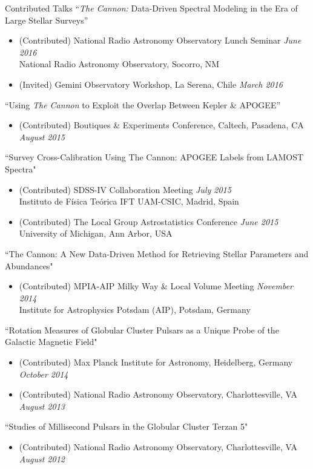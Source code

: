 \documentclass{resume} %
\begin{document}
\begin{rSection}{Contributed Talks}
``\emph{The Cannon:} Data-Driven Spectral Modeling in the Era of Large Stellar Surveys''
\begin{itemize}
  \item
    (Contributed) National Radio Astronomy Observatory Lunch Seminar 
    \hfill {\em June 2016} \\
    National Radio Astronomy Observatory, Socorro, NM
  \item
  (Invited) Gemini Observatory Workshop, La Serena, Chile \hfill {\em March 2016}
\end{itemize}
``Using \emph{The Cannon} to Exploit the Overlap Between Kepler \& APOGEE''
\begin{itemize}
  \item
    (Contributed) Boutiques \& Experiments Conference, Caltech, Pasadena, CA \hfill {\em August 2015}
\end{itemize}
``Survey Cross-Calibration Using The Cannon: APOGEE Labels from LAMOST Spectra"
\begin{itemize}
\item
(Contributed) SDSS-IV Collaboration Meeting \hfill {\em July 2015} \\
Instituto de Física Teórica IFT UAM-CSIC, Madrid, Spain
\item
(Contributed) The Local Group Astrostatistics Conference \hfill {\em June 2015} \\
University of Michigan, Ann Arbor, USA
\end{itemize}

``The Cannon: A New Data-Driven Method for Retrieving Stellar Parameters and Abundances"
\begin{itemize}
\item
(Contributed) MPIA-AIP Milky Way \& Local Volume Meeting  \hfill {\em November 2014} \\
Institute for Astrophysics Potsdam (AIP), Potsdam, Germany
\end{itemize}

``Rotation Measures of Globular Cluster Pulsars as a Unique Probe of the Galactic Magnetic Field"
\begin{itemize}
\item
(Contributed) Max Planck Institute for Astronomy,
Heidelberg, Germany \hfill {\em October 2014}
\item
(Contributed) National Radio Astronomy Observatory, 
Charlottesville, VA \hfill {\em August 2013} 
\end{itemize}


``Studies of Millisecond Pulsars in the Globular Cluster Terzan 5" 
\begin{itemize}
\item
(Contributed) National Radio Astronomy Observatory, 
Charlottesville, VA \hfill {\em August 2012} 
\end{itemize}

\end{rSection}
\end{document}
